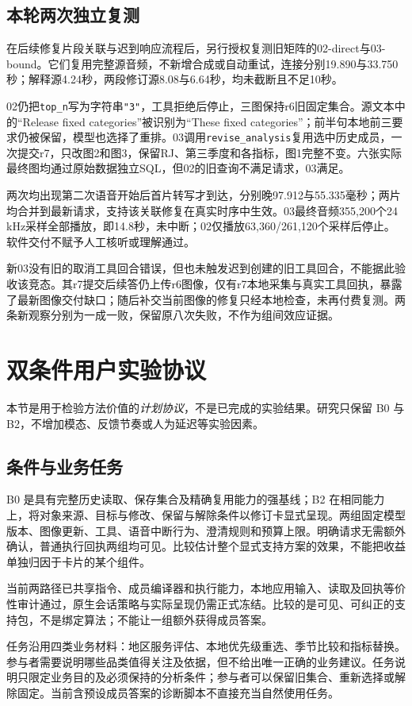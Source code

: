 \documentclass[conference]{IEEEtran}
\begin{document}
\subsection{本轮两次独立复测}
在后续修复片段关联与迟到响应流程后，另行授权复测旧矩阵的02-direct与03-bound。它们复用完整源音频，不新增合成或自动重试，连接分别19.890与33.750秒；解释源4.24秒，两段修订源8.08与6.64秒，均未截断且不足10秒。

02仍把\texttt{top\_n}写为字符串\texttt{"3"}，工具拒绝后停止，三图保持r6旧固定集合。源文本中的“Release fixed categories”被识别为“These fixed categories”；前半句本地前三要求仍被保留，模型也选择了重排。03调用\texttt{revise\_analysis}复用选中历史成员，一次提交r7，只改图2和图3，保留RJ、第三季度和各指标，图1完整不变。六张实际最终图均通过原始数据独立SQL，但02的旧查询不满足请求，03满足。

两次均出现第二次语音开始后首片转写才到达，分别晚97.912与55.335毫秒；两片均合并到最新请求，支持该关联修复在真实时序中生效。03最终音频355,200个24 kHz采样全部播放，即14.8秒，未中断；02仅播放63,360/261,120个采样后停止。软件交付不赋予人工核听或理解通过。

新03没有旧的取消工具回合错误，但也未触发迟到创建的旧工具回合，不能据此验收该竞态。其r7提交后续答仍上传r6图像，仅有r7本地采集与真实工具回执，暴露了最新图像交付缺口；随后补交当前图像的修复只经本地检查，未再付费复测。两条新观察分别为一成一败，保留原八次失败，不作为组间效应证据。

\section{双条件用户实验协议}
本节是用于检验方法价值的\emph{计划协议}，不是已完成的实验结果。研究只保留 B0 与 B2，不增加模态、反馈节奏或人为延迟等实验因素。

\subsection{条件与业务任务}
B0 是具有完整历史读取、保存集合及精确复用能力的强基线；B2 在相同能力上，将对象来源、目标与修改、保留与解除条件以修订卡显式呈现。两组固定模型版本、图像更新、工具、语音中断行为、澄清规则和预算上限。明确请求无需额外确认，普通执行回执两组均可见。比较估计整个显式支持方案的效果，不能把收益单独归因于卡片的某个组件。

当前两路径已共享指令、成员编译器和执行能力，本地应用输入、读取及回执等价性审计通过，原生会话策略与实际呈现仍需正式冻结。比较的是可见、可纠正的支持包，不是绑定算法；不能让一组额外获得成员答案。

任务沿用四类业务材料：地区服务评估、本地优先级重选、季节比较和指标替换。参与者需要说明哪些品类值得关注及依据，但不给出唯一正确的业务建议。任务说明只限定业务目的及必须保持的分析条件；参与者可以保留旧集合、重新选择或解除固定。当前含预设成员答案的诊断脚本不直接充当自然使用任务。
\end{document}

